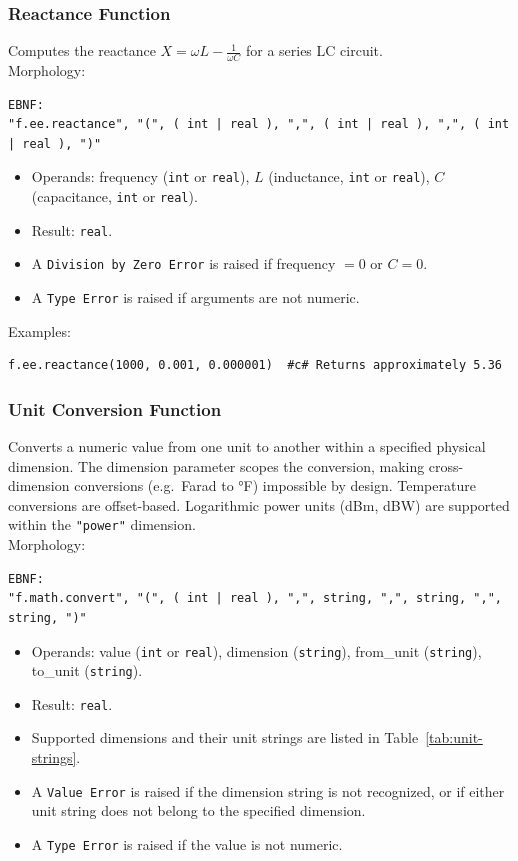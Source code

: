 \subsubsection{Reactance Function}
Computes the reactance $X = \omega L - \frac{1}{\omega C}$ for a series LC circuit. \\
Morphology:
\begin{verbatim}
EBNF:
"f.ee.reactance", "(", ( int | real ), ",", ( int | real ), ",", ( int | real ), ")"
\end{verbatim}
\begin{itemize}
\item Operands: frequency (\texttt{int} or \texttt{real}), $L$ (inductance, \texttt{int} or \texttt{real}), $C$ (capacitance, \texttt{int} or \texttt{real}).
\item Result: \texttt{real}.
\item A \texttt{Division by Zero Error} is raised if frequency $= 0$ or $C = 0$.
\item A \texttt{Type Error} is raised if arguments are not numeric.
\end{itemize}
Examples:
\begin{verbatim}
f.ee.reactance(1000, 0.001, 0.000001)  #c# Returns approximately 5.36
\end{verbatim}

\subsubsection{Unit Conversion Function}
Converts a numeric value from one unit to another within a specified physical dimension. The dimension parameter scopes the conversion, making cross-dimension conversions (e.g.\ Farad to °F) impossible by design. Temperature conversions are offset-based. Logarithmic power units (dBm, dBW) are supported within the \texttt{"power"} dimension. \\
Morphology:
\begin{verbatim}
EBNF:
"f.math.convert", "(", ( int | real ), ",", string, ",", string, ",", string, ")"
\end{verbatim}
\begin{itemize}
\item Operands: value (\texttt{int} or \texttt{real}), dimension (\texttt{string}), from\_unit (\texttt{string}), to\_unit (\texttt{string}).
\item Result: \texttt{real}.
\item Supported dimensions and their unit strings are listed in Table~\ref{tab:unit-strings}.
\item A \texttt{Value Error} is raised if the dimension string is not recognized, or if either unit string does not belong to the specified dimension.
\item A \texttt{Type Error} is raised if the value is not numeric.
\end{itemize}

